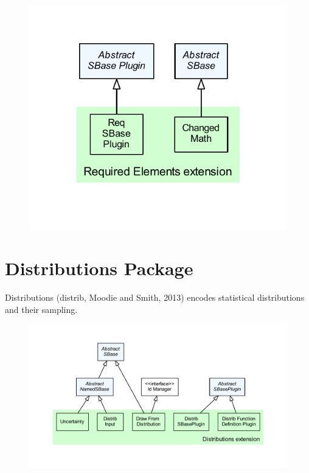 \begin{figure}[hb]
 \centering
 \vspace*{2ex}
 \includegraphics[width=\textwidth]{../../../extensions/req/doc/img/type_hierarchy.pdf}
 \caption[The arrays extension]{}
 \label{fig:arrays}
\end{figure}


\section{Distributions Package}
\label{sec:distrib-overview}
Distributions (distrib, Moodie and Smith, 2013) encodes
statistical distributions and their sampling.

\begin{figure}[hb]
 \centering
 \vspace*{2ex}
 \includegraphics[width=\textwidth]{../../../extensions/distrib/doc/img/type_hierarchy.pdf}
 \caption[The distributions extension]{}
 \label{fig:distrib}
\end{figure}


